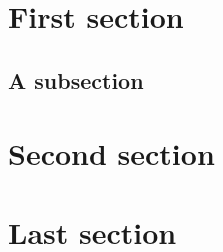\documentclass{article}
\begin{document}
\section{First section}

\lipsum[1]


\subsection{A subsection}

\lipsum[1-2]


\section{Second section}

\lipsum[2]


\section{Last section}

\lipsum[3]
\end{document}
